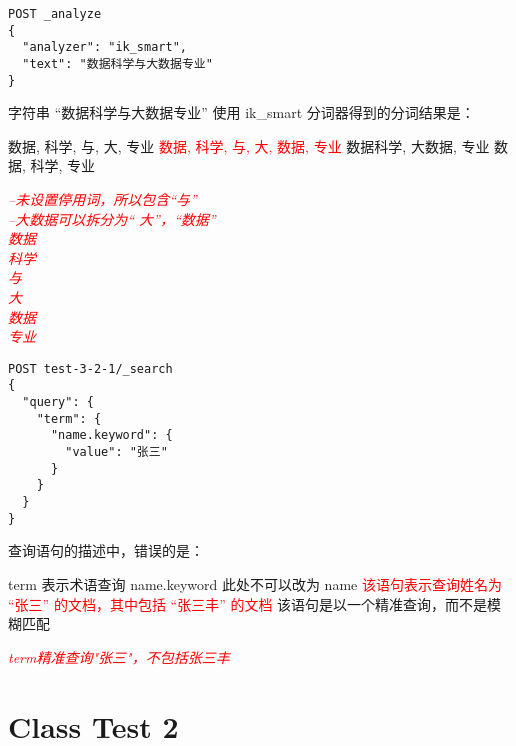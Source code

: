 \documentclass{exam}
\begin{document}
\begin{questions}
\question
\begin{verbatim}
POST _analyze
{
  "analyzer": "ik_smart",
  "text": "数据科学与大数据专业"
}
\end{verbatim}
字符串 “数据科学与大数据专业” 使用 ik\_smart 分词器得到的分词结果是：
\begin{choices}
    \choice 数据, 科学, 与, 大, 专业
    \choice \textcolor{red}{数据, 科学, 与, 大, 数据, 专业}
    \choice 数据科学, 大数据, 专业
    \choice 数据, 科学, 专业
\end{choices}
\textit{\textcolor{red}{
--未设置停用词，所以包含“与”\\
--大数据可以拆分为“ 大”，“数据”\\
数据\\
科学\\
与\\
大\\
数据\\
专业}}

\question
\begin{verbatim}
POST test-3-2-1/_search
{
  "query": {
    "term": {
      "name.keyword": {
        "value": "张三"
      }
    }
  }
}
\end{verbatim}
查询语句的描述中，错误的是：
\begin{choices}
    \choice term 表示术语查询
    \choice name.keyword 此处不可以改为 name
    \choice \textcolor{red}{该语句表示查询姓名为 “张三” 的文档，其中包括 “张三丰” 的文档}
    \choice 该语句是以一个精准查询，而不是模糊匹配
\end{choices}
\textit{\textcolor{red}{term精准查询"张三"，不包括张三丰}}

\end{questions}

\section{Class Test 2}
\end{document}
